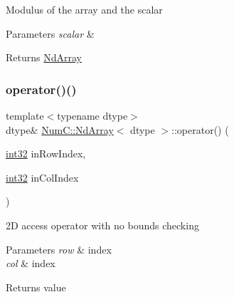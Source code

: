 Modulus of the array and the scalar


\begin{DoxyParams}{Parameters}
{\em scalar} & \\
\hline
\end{DoxyParams}
\begin{DoxyReturn}{Returns}
\mbox{\hyperlink{class_num_c_1_1_nd_array}{Nd\+Array}} 
\end{DoxyReturn}
\mbox{\label{class_num_c_1_1_nd_array_ae169bd3c7ad2bd3254c8317c173bb83b}} 
\subsubsection{\texorpdfstring{operator()()}{operator()()}\hspace{0.1cm}{\footnotesize\ttfamily [1/5]}}
{\footnotesize\ttfamily template$<$typename dtype$>$ \\
dtype\& \mbox{\hyperlink{class_num_c_1_1_nd_array}{Num\+C\+::\+Nd\+Array}}$<$ dtype $>$\+::operator() (\begin{DoxyParamCaption}\item[{\mbox{\hyperlink{namespace_num_c_aa5a7e69266097d55816d4cdb19542b53}{int32}}}]{in\+Row\+Index,  }\item[{\mbox{\hyperlink{namespace_num_c_aa5a7e69266097d55816d4cdb19542b53}{int32}}}]{in\+Col\+Index }\end{DoxyParamCaption})\hspace{0.3cm}{\ttfamily [inline]}}

2D access operator with no bounds checking


\begin{DoxyParams}{Parameters}
{\em row} & index \\
\hline
{\em col} & index \\
\hline
\end{DoxyParams}
\begin{DoxyReturn}{Returns}
value 
\end{DoxyReturn}
\mbox{\label{class_num_c_1_1_nd_array_a1e7b94b3396715c3d6a3befc24b907e3}} 

